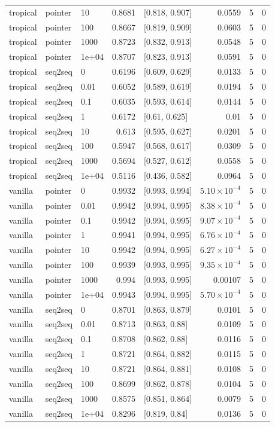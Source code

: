 \documentclass[10pt]{article}
\begin{document}
{\begin{longtable}{lllrlrrr}
tropical & pointer & 10 & 0.8681 & [0.818, 0.907] & 0.0559 & 5 & 0\\
tropical & pointer & 100 & 0.8667 & [0.819, 0.909] & 0.0603 & 5 & 0\\
tropical & pointer & 1000 & 0.8723 & [0.832, 0.913] & 0.0548 & 5 & 0\\
tropical & pointer & 1e+04 & 0.8707 & [0.823, 0.913] & 0.0591 & 5 & 0\\
tropical & seq2seq & 0 & 0.6196 & [0.609, 0.629] & 0.0133 & 5 & 0\\
tropical & seq2seq & 0.01 & 0.6052 & [0.589, 0.619] & 0.0194 & 5 & 0\\
tropical & seq2seq & 0.1 & 0.6035 & [0.593, 0.614] & 0.0144 & 5 & 0\\
tropical & seq2seq & 1 & 0.6172 & [0.61, 0.625] & 0.01 & 5 & 0\\
tropical & seq2seq & 10 & 0.613 & [0.595, 0.627] & 0.0201 & 5 & 0\\
tropical & seq2seq & 100 & 0.5947 & [0.568, 0.617] & 0.0309 & 5 & 0\\
tropical & seq2seq & 1000 & 0.5694 & [0.527, 0.612] & 0.0558 & 5 & 0\\
tropical & seq2seq & 1e+04 & 0.5116 & [0.436, 0.582] & 0.0964 & 5 & 0\\
vanilla & pointer & 0 & 0.9932 & [0.993, 0.994] & $5.10\times10^{-4}$ & 5 & 0\\
vanilla & pointer & 0.01 & 0.9942 & [0.994, 0.995] & $8.38\times10^{-4}$ & 5 & 0\\
vanilla & pointer & 0.1 & 0.9942 & [0.994, 0.995] & $9.07\times10^{-4}$ & 5 & 0\\
vanilla & pointer & 1 & 0.9941 & [0.994, 0.995] & $6.76\times10^{-4}$ & 5 & 0\\
vanilla & pointer & 10 & 0.9942 & [0.994, 0.995] & $6.27\times10^{-4}$ & 5 & 0\\
vanilla & pointer & 100 & 0.9939 & [0.993, 0.995] & $9.35\times10^{-4}$ & 5 & 0\\
vanilla & pointer & 1000 & 0.994 & [0.993, 0.995] & 0.00107 & 5 & 0\\
vanilla & pointer & 1e+04 & 0.9943 & [0.994, 0.995] & $5.70\times10^{-4}$ & 5 & 0\\
vanilla & seq2seq & 0 & 0.8701 & [0.863, 0.879] & 0.0101 & 5 & 0\\
vanilla & seq2seq & 0.01 & 0.8713 & [0.863, 0.88] & 0.0109 & 5 & 0\\
vanilla & seq2seq & 0.1 & 0.8708 & [0.862, 0.88] & 0.0116 & 5 & 0\\
vanilla & seq2seq & 1 & 0.8721 & [0.864, 0.882] & 0.0115 & 5 & 0\\
vanilla & seq2seq & 10 & 0.8721 & [0.864, 0.881] & 0.0108 & 5 & 0\\
vanilla & seq2seq & 100 & 0.8699 & [0.862, 0.878] & 0.0104 & 5 & 0\\
vanilla & seq2seq & 1000 & 0.8575 & [0.851, 0.864] & 0.0079 & 5 & 0\\
vanilla & seq2seq & 1e+04 & 0.8296 & [0.819, 0.84] & 0.0136 & 5 & 0\\
\bottomrule
\end{longtable}
}
\end{document}

